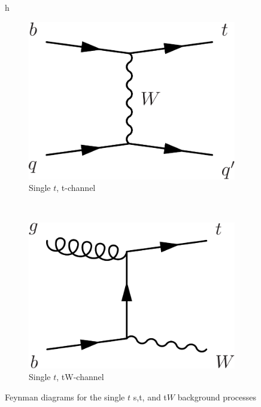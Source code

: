 \begin{figure}{h}
\begin{subfigure}[h]{0.3\textwidth}
        \includegraphics[width=\textwidth]{Figures/Feynman_Diagrams/backgrounds_singleT_tChan.pdf}
        \caption{Single $t$, t-channel}\label{fd:t_tChan}
      \end{subfigure}
      ~ %
      \begin{subfigure}[h]{0.3\textwidth}
        \includegraphics[width=\textwidth]{Figures/Feynman_Diagrams/backgrounds_singleT_tWChan.pdf}
        \caption{Single $t$, tW-channel}\label{fd:t_tWChan}
      \end{subfigure}
      \caption{Feynman diagrams for the single $t$ s,t, and t$W$ background processes} \label{fig:feynman_diagrams__singleT_t_s_tW_channels}
\end{figure}



